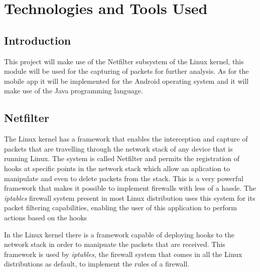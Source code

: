 \chapter{Technologies and Tools Used}
\label{chap:tech}


\section{Introduction}
\label{chap3:sec:intro}
This project will make use of the Netfilter subsystem of the Linux kernel, this
module will be used for the capturing of packets for further analysis. As for
the mobile app it will be implemented for the Android operating system and it
will make use of the Java programming language.

\section{Netfilter}
\label{chap3:sec:netfilter}
The Linux kernel has a framework that enables the interception and capture of
packets that are travelling through the network stack of any device that is
running Linux. The system is called Netfilter and permits the registration of
hooks at specific points in the network stack which allow an aplication to
manipulate and even to delete packets from the stack. This is a very powerful
framework that makes it possible to implement firewalls with less of a hassle.
The \emph{iptables} firewall system present in most Linux distribution uses this
system for its packet filtering capabilities, enabling the user of this
application to perform actions based on the hooks

In the Linux kernel there is a framework capable of deploying hooks to the
network stack in order to manipuate the packets that are received. This
framework is used by \emph{iptables}, the firewall system that comes in all the
Linux distributions as default, to implement the rules of a firewall.

